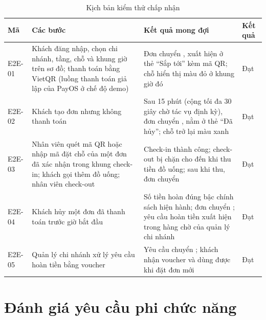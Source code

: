 \begin{table}[!htbp]
\centering
\caption{Kịch bản kiểm thử chấp nhận}
\label{tab:kt-e2e}
\footnotesize
\renewcommand{\arraystretch}{1.15}
\begin{tabularx}{\linewidth}{|P{1.2cm}|P{4.6cm}|L|P{1.1cm}|}
\hline
\textbf{Mã} & \textbf{Các bước} & \textbf{Kết quả mong đợi} & \textbf{Kết quả} \\
\hline
E2E-01 & Khách đăng nhập, chọn chi nhánh, tầng, chỗ và khung giờ trên sơ đồ; thanh toán bằng VietQR (luồng thanh toán giả lập của PayOS ở chế độ demo) & Đơn chuyển , xuất hiện ở thẻ ``Sắp tới'' kèm mã QR; chỗ hiển thị màu đỏ ở khung giờ đó & Đạt \\
\hline
E2E-02 & Khách tạo đơn nhưng không thanh toán & Sau 15 phút (cộng tối đa 30 giây chờ tác vụ định kỳ), đơn chuyển , nằm ở thẻ ``Đã hủy''; chỗ trở lại màu xanh & Đạt \\
\hline
E2E-03 & Nhân viên quét mã QR hoặc nhập mã đặt chỗ của một đơn đã xác nhận trong khung check-in; khách gọi thêm đồ uống; nhân viên check-out & Check-in thành công; check-out bị chặn cho đến khi thu tiền đồ uống; sau khi thu, đơn chuyển  & Đạt \\
\hline
E2E-04 & Khách hủy một đơn đã thanh toán trước giờ bắt đầu & Số tiền hoàn đúng bậc chính sách hiện hành; đơn chuyển ; yêu cầu hoàn tiền xuất hiện trong hàng chờ của quản lý chi nhánh & Đạt \\
\hline
E2E-05 & Quản lý chi nhánh xử lý yêu cầu hoàn tiền bằng voucher & Yêu cầu chuyển ; khách nhận voucher và dùng được khi đặt đơn mới & Đạt \\
\hline
\end{tabularx}
\end{table}

\section{Đánh giá yêu cầu phi chức năng}
\label{sec:kt-nfr}

